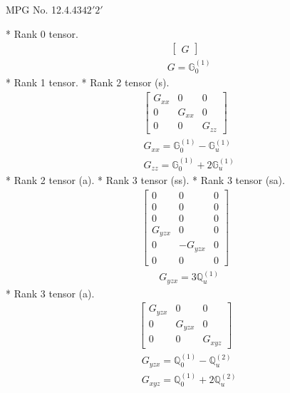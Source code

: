 \documentclass[fleqn,8pt,landscape]{jsarticle}
\begin{document}
\setcounter{MaxMatrixCols}{32}

\renewcommand{\tablename}{Table~}
\renewcommand{\figurename}{Figure~}
\begin{center}
\LARGE
MPG No. 12.4.43\quad$42'2'$
\end{center}
* Rank 0 tensor.
\begin{align*}
\begin{bmatrix} G \end{bmatrix}
\end{align*}
\begin{align*}
& G = \mathbb{G}_{0}^{(1)}
\end{align*}
* Rank 1 tensor.
* Rank 2 tensor (s).
\begin{align*}
\begin{bmatrix} G_{xx} & 0 & 0 \\ 0 & G_{xx} & 0 \\ 0 & 0 & G_{zz} \end{bmatrix}
\end{align*}
\begin{align*}
& G_{xx} = \mathbb{G}_{0}^{(1)} - \mathbb{G}_{u}^{(1)} \\
& G_{zz} = \mathbb{G}_{0}^{(1)} + 2 \mathbb{G}_{u}^{(1)}
\end{align*}
* Rank 2 tensor (a).
* Rank 3 tensor (ss).
* Rank 3 tensor (sa).
\begin{align*}
\begin{bmatrix} 0 & 0 & 0 \\ 0 & 0 & 0 \\ 0 & 0 & 0 \\ G_{yzx} & 0 & 0 \\ 0 & - G_{yzx} & 0 \\ 0 & 0 & 0 \end{bmatrix}
\end{align*}
\begin{align*}
& G_{yzx} = 3 \mathbb{Q}_{u}^{(1)}
\end{align*}
* Rank 3 tensor (a).
\begin{align*}
\begin{bmatrix} G_{yzx} & 0 & 0 \\ 0 & G_{yzx} & 0 \\ 0 & 0 & G_{xyz} \end{bmatrix}
\end{align*}
\begin{align*}
& G_{yzx} = \mathbb{Q}_{0}^{(1)} - \mathbb{Q}_{u}^{(2)} \\
& G_{xyz} = \mathbb{Q}_{0}^{(1)} + 2 \mathbb{Q}_{u}^{(2)}
\end{align*}
\end{document}
